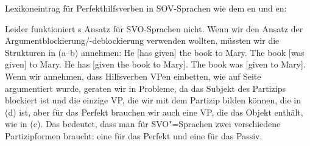 \eas
Lexikoneintrag für Perfekthilfsverben in SOV-Sprachen wie dem en und en:\\[1mm]
\zs


\noindent
Leider funktioniert \citeauthor{Haider86}s Ansatz für SVO-Sprachen nicht. Wenn wir den
Ansatz der Argumentblockierung/-deblockierung verwenden wollten, müssten wir die Strukturen in (a--b) annehmen:
\eal
\ex He [has given] the book to Mary.
\ex The book [was given] to Mary.
\ex He has [given the book to Mary].
\ex The book was [given to Mary].
\zl
Wenn wir annehmen, dass Hilfsverben VPen einbetten, wie auf Seite~\pageref{page-English-Aux-VPs} argumentiert wurde, geraten wir
in Probleme, da das Subjekt des Partizips blockiert ist und die einzige VP, die wir mit dem
Partizip bilden können, die in (d) ist, aber für das Perfekt brauchen wir auch eine VP, die das Objekt enthält, wie
in (c).
Das bedeutet, dass man für SVO"=Sprachen zwei verschiedene Partizipformen braucht: eine für das
Perfekt und eine für das Passiv.%





